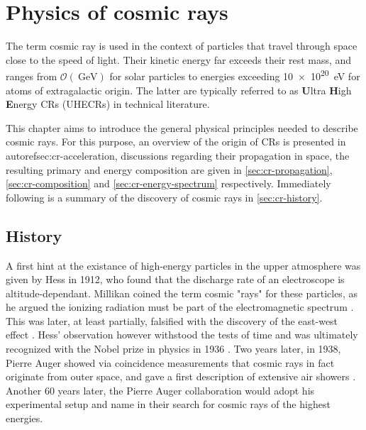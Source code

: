 
\chapter{Physics of cosmic rays}
\label{chap:physical-background}

The term cosmic ray is used in the context of particles that travel through space close to the speed of light. Their kinetic energy far exceeds their
rest 
mass, and ranges from $\mathcal{O}(\SI{}{\giga\electronvolt})$ for solar particles to energies exceeding \SI{10e20}{\electronvolt} for atoms of
extragalactic origin. The latter are typically referred to as \textbf{U}ltra \textbf{H}igh \textbf{E}nergy CRs (UHECRs) in technical literature.

This chapter aims to introduce the general physical principles needed to describe cosmic rays. For this purpose, an overview of the origin of CRs is presented in
autoref{sec:cr-acceleration}, discussions regarding their propagation in space, the resulting primary and energy composition are given in \autoref{sec:cr-propagation}, 
\autoref{sec:cr-composition} and \autoref{sec:cr-energy-spectrum} respectively. Immediately following is a summary of the discovery of cosmic rays in \autoref{sec:cr-history}.

\section{History}
\label{sec:cr-history}

A first hint at the existance of high-energy particles in the upper atmosphere was given by Hess in 1912, who found that the discharge rate of an electroscope is 
altitude-dependant. Millikan coined the term cosmic "rays" for these particles, as he argued the ionizing radiation must be part of the electromagnetic spectrum 
\cite{millikan1928origin}. This was later, at least partially, falsified with the discovery of the east-west effect \cite{johnson1938note}. Hess' observation 
however withstood the tests of time and was ultimately recognized with the Nobel prize in physics in 1936 \cite{nobelprize1936}. Two years later, in 1938, Pierre 
Auger showed via coincidence measurements that cosmic rays in fact originate from outer space, and gave a first description of extensive air showers 
\cite{auger1939extensive}. Another 60 years later, the Pierre Auger collaboration would adopt his experimental setup and name in their search for cosmic rays of 
the highest energies.

